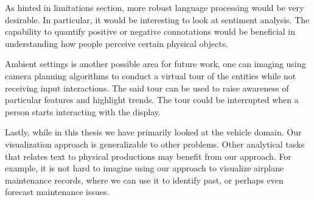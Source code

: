 As hinted in limitations section, more robust language processing would be very
desirable. In particular, it would be interesting to look at sentiment analysis.
The capability to quantify positive or negative connotations would be beneficial
in understanding how people perceive certain physical objects.

Ambient settings is another possible area for future work, one can imaging using
camera planning algorithms to conduct a virtual tour of the entities while not
receiving input interactions. The said tour can be used to raise awareness of
particular features and highlight trends. The tour could be interrupted when a
person starts interacting with the display.

Lastly, while in this thesis we have primarily looked at the vehicle domain. Our
visualization approach is generalizable to other problems. Other analytical
tasks that relates text to physical productions may benefit from our approach. For
example, it is not hard to imagine using our approach to visualize airplane
maintenance records, where we can use it to identify past, or perhaps even
forecast maintenance issues.
